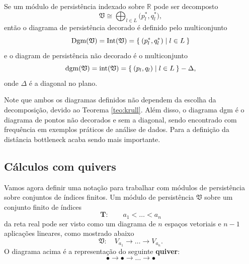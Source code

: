 Se um módulo de persistência indexado sobre $\mathbb{R}$ pode ser decomposto
\begin{equation*}
    \mathfrak{V} \cong \bigoplus_{l \in L} \mathbf(p_l^*, q_l^*),
\end{equation*}
então o diagrama de persistência decorado é definido pelo multiconjunto
\begin{equation*}
    \text{Dgm} (\mathfrak{V}) = \text{Int}(\mathfrak{V}) = \Set{(p_l^*, q_l^*) | l \in L}
\end{equation*}
e o diagram de persistência não decorado é o multiconjunto
\begin{equation*}
    \text{dgm} (\mathfrak{V}) = \text{int}(\mathfrak{V}) = \Set{(p_l, q_l) | l \in L} - \Delta,
\end{equation*}
onde $\Delta$ é a diagonal no plano.

Note que ambos os diagramas definidos não dependem da escolha da decomposição, devido ao Teorema \ref{teo:krull}. 
Além disso, o diagrama dgm é o diagrama de pontos não decorados e sem a diagonal, sendo encontrado com 
frequência em exemplos práticos de análise de dados. Para a definição da distância bottleneck acaba sendo 
mais importante. 

\subsection{Cálculos com quivers}

Vamos agora definir uma notação para trabalhar com módulos de persistência sobre conjuntos de índices 
finitos. 
Um módulo de persistência $\mathfrak{V}$ sobre um conjunto finito de índices
\begin{equation*}
    \mathbf{T} : \qquad a_1 < \dots < a_n 
\end{equation*} 
da reta real pode ser visto como um diagrama de $n$ espaços vetoriais e $n-1$ aplicações lineares, como
mostrado abaixo
\begin{equation*}
    \mathfrak{V} : \quad V_{a_1} \longrightarrow \dots \longrightarrow V_{a_n}.
\end{equation*}
O diagrama acima é a representação do seguinte \textbf{quiver}:
\begin{equation*}
    \bullet \longrightarrow \bullet \longrightarrow \dots \longrightarrow \bullet
\end{equation*}

